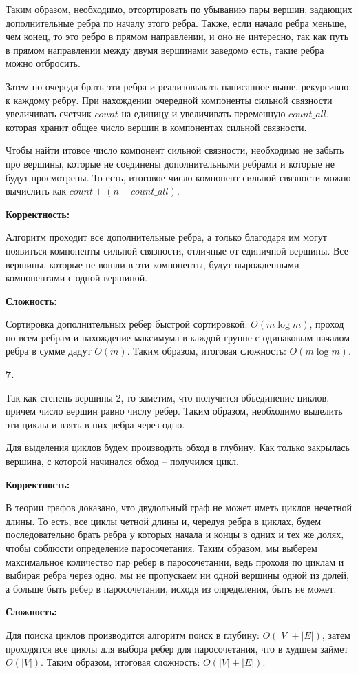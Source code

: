 \documentclass[12pt]{extreport}
\begin{document}
Таким образом, необходимо, отсортировать по убыванию пары вершин, задающих дополнительные ребра по началу этого ребра. Также, если начало ребра меньше, чем конец, то это ребро в прямом направлении, и оно не интересно, так как путь в прямом направлении между двумя вершинами заведомо есть, такие ребра можно отбросить. 

Затем по очереди брать эти ребра и реализовывать написанное выше, рекурсивно к каждому ребру. При нахождении очередной компоненты сильной связности увеличивать счетчик $count$ на единицу и увеличивать переменную $count\_all$, которая хранит общее число вершин в компонентах сильной связности.

Чтобы найти итовое число компонент сильной связности, необходимо не забыть про вершины, которые не соединены дополнительными ребрами и которые не будут просмотрены. То есть, итоговое число компонент сильной связности можно вычислить как $count + (n-count\_all)$.

\bigskip 
{\bf Корректность:}

Алгоритм проходит все дополнительные ребра, а только благодаря им могут появиться компоненты сильной связности, отличные от единичной вершины. Все вершины, которые не вошли в эти компоненты, будут вырожденными компонентами с одной вершиной. 

\bigskip 
{\bf Сложность:} 

Сортировка дополнительных ребер быстрой сортировкой: $O(m \log m)$, проход по всем ребрам и нахождение максимума в каждой группе с одинаковым началом ребра в сумме дадут $O(m)$. Таким образом, итоговая сложность: $O(m \log m)$.

\bigskip 
{\bf 7.} 

Так как степень вершины 2, то заметим, что получится объединение циклов, причем число вершин равно числу ребер. Таким образом, необходимо выделить эти циклы и взять в них ребра через одно. 

Для выделения циклов будем производить обход в глубину. Как только закрылась вершина, с которой начинался обход -- получился цикл. 

\bigskip 
{\bf Корректность:}

В теории графов доказано, что двудольный граф не может иметь циклов нечетной длины. То есть, все циклы четной длины и, чередуя ребра в циклах, будем последовательно брать ребра у которых начала и концы в одних и тех же долях, чтобы соблюсти определение паросочетания. Таким образом, мы выберем максимальное количество пар ребер в паросочетании, ведь проходя по циклам и выбирая ребра через одно, мы не пропускаем ни одной вершины одной из долей, а больше быть ребер в паросочетании, исходя из определения, быть не может. 

\bigskip 
{\bf Сложность:} 

Для поиска циклов производится алгоритм поиск в глубину: $O(|V|+|E|)$, затем проходятся все циклы для выбора ребер для паросочетания, что в худшем займет $O(|V|)$. Таким образом, итоговая сложность: $O(|V|+|E|)$.
\end{document}
